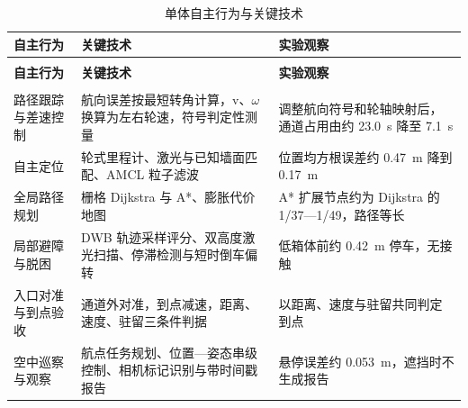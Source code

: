 \begingroup\small
\setlength{\tableavailable}{\dimexpr\linewidth-4\tabcolsep\relax}
\begin{longtable}{@{}>{\raggedright\arraybackslash}p{0.23000\tableavailable}>{\raggedright\arraybackslash}p{0.43000\tableavailable}>{\raggedright\arraybackslash}p{0.34000\tableavailable}@{}}
\caption{单体自主行为与关键技术}\label{tab:13}\\
\toprule
\textbf{自主行为} & \textbf{关键技术} & \textbf{实验观察} \\
\midrule
\endfirsthead
\multicolumn{3}{@{}l}{\small\color{muted}表~\thetable\quad （续）}\\
\toprule
\textbf{自主行为} & \textbf{关键技术} & \textbf{实验观察} \\
\midrule
\endhead
\midrule
\multicolumn{3}{r@{}}{\footnotesize\color{muted}续下页}\\
\endfoot
\bottomrule
\endlastfoot
路径跟踪与差速控制 & 航向误差按最短转角计算，v、\ensuremath{\omega} 换算为左右轮速，符号判定性测量 & 调整航向符号和轮轴映射后，通道占用由约 23.0~s 降至 7.1~s \\
自主定位 & 轮式里程计、激光与已知墙面匹配、AMCL 粒子滤波 & 位置均方根误差约 0.47~m 降到 0.17~m \\
全局路径规划 & 栅格 Dijkstra 与 A*、膨胀代价地图 & A* 扩展节点约为 Dijkstra 的 1/37—1/49，路径等长 \\
局部避障与脱困 & DWB 轨迹采样评分、双高度激光扫描、停滞检测与短时倒车偏转 & 低箱体前约 0.42~m 停车，无接触 \\
入口对准与到点验收 & 通道外对准，到点减速，距离、速度、驻留三条件判据 & 以距离、速度与驻留共同判定到点 \\
空中巡察与观察 & 航点任务规划、位置—姿态串级控制、相机标记识别与带时间戳报告 & 悬停误差约 0.053~m，遮挡时不生成报告 \\
\end{longtable}
\endgroup
